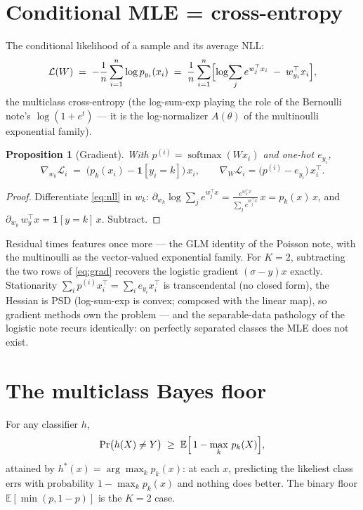 \documentclass[11pt]{article}
\newtheorem{proposition}{Proposition}
\begin{document}
\section{Conditional MLE = cross-entropy}

The conditional likelihood of a sample and its average NLL:
\begin{equation}
  \mathcal{L}(W)
  \;=\; -\frac1n \sum_{i=1}^n \log p_{y_i}(x_i)
  \;=\; \frac1n \sum_{i=1}^n
  \Bigl[\log\!\sum_j e^{w_j^\top x_i} \;-\; w_{y_i}^\top x_i\Bigr],
  \label{eq:nll}
\end{equation}
the multiclass cross-entropy (the log-sum-exp playing the role of the
Bernoulli note's $\log(1+e^t)$ --- it is the log-normalizer $A(\theta)$
of the multinoulli exponential family).

\begin{proposition}[Gradient]
With $p^{(i)} = \operatorname{softmax}(W x_i)$ and one-hot $e_{y_i}$,
\begin{equation}
  \boxed{\;\nabla_{w_k} \mathcal{L}_i
  \;=\; \bigl(p_k(x_i) - \mathbf{1}[y_i = k]\bigr)\, x_i,
  \qquad
  \nabla_W \mathcal{L}_i = \bigl(p^{(i)} - e_{y_i}\bigr)\, x_i^\top .\;}
  \label{eq:grad}
\end{equation}
\end{proposition}

\begin{proof}
Differentiate \eqref{eq:nll} in $w_k$:
$\partial_{w_k} \log\sum_j e^{w_j^\top x} =
\frac{e^{w_k^\top x}}{\sum_j e^{w_j^\top x}}\,x = p_k(x)\,x$, and
$\partial_{w_k}\, w_{y}^\top x = \mathbf{1}[y=k]\, x$. Subtract.
\end{proof}

Residual times features once more --- the GLM identity of the Poisson
note, with the multinoulli as the vector-valued exponential family. For
$K=2$, subtracting the two rows of \eqref{eq:grad} recovers the logistic
gradient $(\sigma - y)x$ exactly. Stationarity
$\sum_i p^{(i)} x_i^\top = \sum_i e_{y_i} x_i^\top$ is transcendental
(no closed form), the Hessian is PSD (log-sum-exp is convex; composed
with the linear map), so gradient methods own the problem --- and the
separable-data pathology of the logistic note recurs identically: on
perfectly separated classes the MLE does not exist.

\section{The multiclass Bayes floor}

For any classifier $h$,
\begin{equation}
  \Pr\bigl(h(X)\ne Y\bigr)
  \;\ge\; \mathbb{E}\Bigl[\,1 - \max_k\, p_k(X)\Bigr],
  \label{eq:bayes}
\end{equation}
attained by $h^\ast(x) = \arg\max_k p_k(x)$: at each $x$, predicting the
likeliest class errs with probability $1-\max_k p_k(x)$ and nothing does
better. The binary floor $\mathbb{E}[\min(p, 1-p)]$ is the $K=2$ case.
\end{document}
